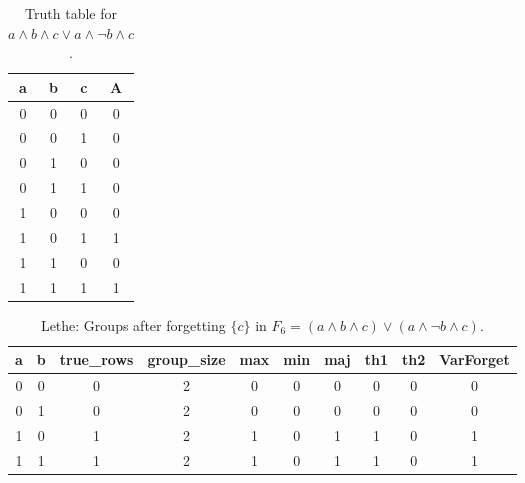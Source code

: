 \begin{table}[!tb]
    \centering
    \begin{tabular}{|c|c|c|c|}
        \hline
        \textbf{a} & \textbf{b} & \textbf{c} & \textbf{A} \\ \hline
        0 & 0 & 0 & 0 \\ \hline
        0 & 0 & 1 & 0 \\ \hline
        0 & 1 & 0 & 0 \\ \hline
        0 & 1 & 1 & 0 \\ \hline
        1 & 0 & 0 & 0 \\ \hline
        1 & 0 & 1 & 1 \\ \hline
        1 & 1 & 0 & 0 \\ \hline
        1 & 1 & 1 & 1 \\ \hline
    \end{tabular}
    \caption{Truth table for $a \land b \land c \lor a \land \lnot b \land c$.}
    \label{tab:truthtab}
\end{table}

\begin{table}[!tb]
    \centering
    \begin{tabular}{|c|c|c|c|c|c|c|c|c|c|}
        \hline
        \textbf{a} & \textbf{b} & \textbf{true\_rows} & \textbf{group\_size} & \textbf{max} & \textbf{min} & \textbf{maj} & \textbf{th1} & \textbf{th2} & \textbf{VarForget} \\ \hline
        \rowcolor{gray!40} 0 & 0 & 0 & 2 & 0 & 0 & 0 & 0 & 0 & 0 \\ \hline
        \rowcolor{blue!40} 0 & 1 & 0 & 2 & 0 & 0 & 0 & 0 & 0 & 0 \\ \hline
        \rowcolor{red!40} 1 & 0 & 1 & 2 & 1 & 0 & 1 & 1 & 0 & 1 \\ \hline
        \rowcolor{green!40} 1 & 1 & 1 & 2 & 1 & 0 & 1 & 1 & 0 & 1 \\ \hline
    \end{tabular}
    \caption{Lethe: Groups after forgetting $\{c\}$ in $F_{6} = (a \land b \land c) \lor (a \land \lnot b \land c)$.}
    \label{tab:lethe-F6-c-groups}
\end{table}
